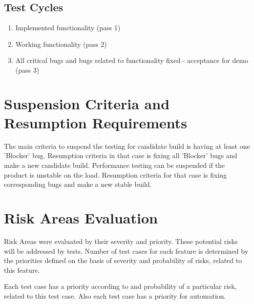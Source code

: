\documentclass[a4paper,11pt]{article}
\begin{document}
\subsection{Test Cycles}
\begin{enumerate}
\item Implemented functionality (pass 1)
\item Working functionality (pass 2)
\item All critical bugs and bugs related to functionality fixed - acceptance for demo (pass 3)
\end{enumerate}


\section{Suspension Criteria and Resumption Requirements}

The main criteria to suspend the testing for candidate build is having at least one 'Blocker' bug. Resumption criteria in that case is fixing all 'Blocker' bugs and make a new candidate build.
Performance testing can be suspended if the product is unstable on the load. Resumption criteria for that case is fixing corresponding bugs and make a new stable build.


\section{Risk Areas Evaluation}

Risk Areas were evaluated by their severity and priority. These potential risks will be addressed by tests. Number of test cases for each feature is determined by the priorities defined on the basis of severity and probability of risks, related to this feature.

Each test case has a priority according to and probability of a particular risk, related to this test case. Also each test case has a priority for automation.
\end{document}
